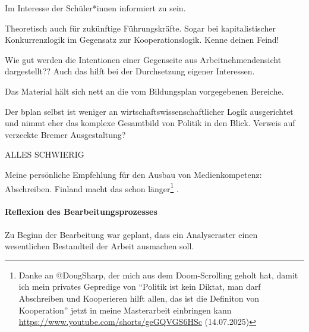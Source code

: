 Im Interesse der Schüler*innen informiert zu sein.

Theoretisch auch für zukünftige Führungskräfte. Sogar bei kapitalistischer Konkurrenzlogik im Gegensatz zur Kooperationslogik. Kenne deinen Feind!

Wie gut werden die Intentionen einer Gegenseite aus Arbeitnehmendensicht dargestellt??
Auch das hilft bei der Durchsetzung eigener Interessen.

Das Material hält sich nett an die vom Bildungsplan vorgegebenen Bereiche. 

Der bplan selbst ist weniger an wirtschaftswissenschaftlicher Logik ausgerichtet und nimmt eher das komplexe Gesamtbild von Politik in den Blick.
Verweis auf verzeckte Bremer Ausgestaltung?

ALLES SCHWIERIG



Meine persönliche Empfehlung für den Ausbau von Medienkompetenz: Abschreiben. Finland macht das schon länger\footnote{
    Danke an @DougSharp, der mich aus dem Doom-Scrolling geholt hat, damit ich mein privates Gepredige von \enquote{Politik ist kein Diktat, man darf Abschreiben und Kooperieren hilft allen, das ist die Definiton von Kooperation} jetzt in meine Masterarbeit einbringen kann \url{https://www.youtube.com/shorts/geGQVGS6HSc} (14.07.2025)
} \autocites(\gls{vgl} überblicksweise \gls{zb})()[][]{Palsa.2015}{Salomaa.2019}. 


\paragraph{Reflexion des Bearbeitungsprozesses}

Zu Beginn der Bearbeitung war geplant, dass ein Analyseraster einen wesentlichen Bestandteil der Arbeit ausmachen soll. 


